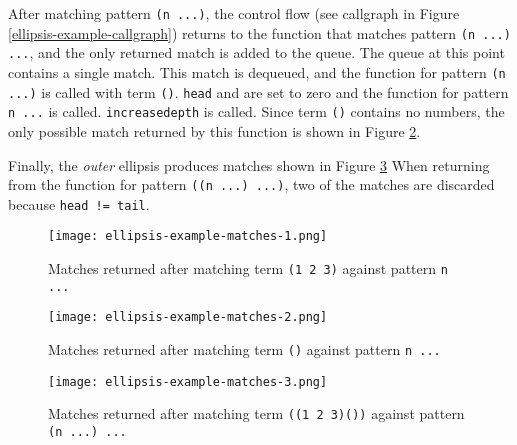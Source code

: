 After matching pattern \texttt{(n ...)}, the control flow (see callgraph in Figure \ref{ellipsis-example-callgraph}) returns to the function that matches pattern \texttt{(n ...) ...}, and the only returned match is added to the queue. The queue at this point contains a single match. This match is dequeued, and the function for pattern \texttt{(n ...)} is called with term \texttt{()}. \texttt{head} and  are set to zero and the function for pattern \texttt{n ...} is called. \texttt{increasedepth} is called. Since term \texttt{()} contains no numbers, the only possible match returned by this function is shown in Figure \ref{ellipsis-example-matches-2}.

Finally, the \textit{outer} ellipsis produces matches shown in Figure \ref{ellipsis-example-matches-3} When returning from the function for pattern \texttt{((n ...) ...)}, two of the matches are discarded because \texttt{head != tail}.

\begin{figure}[!htb]
\texttt{[image: ellipsis-example-matches-1.png]}
\caption{Matches returned after matching term \texttt{(1 2 3)} against pattern \texttt{n ...}}
\label{ellipsis-example-matches-1}
\end{figure}

\begin{figure}[!tbh]
\texttt{[image: ellipsis-example-matches-2.png]}
\caption{Matches returned after matching term \texttt{()} against pattern \texttt{n ...}}
\label{ellipsis-example-matches-2}
\end{figure}

\begin{figure}[!htb]
\texttt{[image: ellipsis-example-matches-3.png]}
\caption{Matches returned after matching term \texttt{((1 2 3)())} against pattern \texttt{(n ...) ...} }
\label{ellipsis-example-matches-3}
\end{figure}

